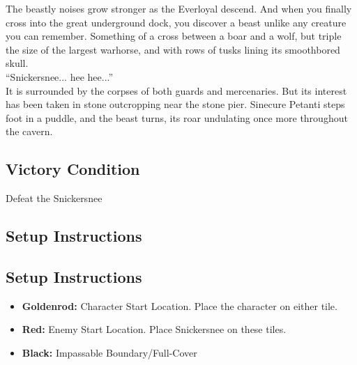 


The beastly noises grow stronger as the Everloyal descend. And when you finally cross into the great underground dock, you discover a beast unlike any creature you can remember. Something of a cross between a boar and a wolf, but triple the size of the largest warhorse, and with rows of tusks lining its smoothbored skull.\\

“Snickersnee... hee hee...”\\

It is surrounded by the corpses of both guards and mercenaries. But its interest has been taken in stone outcropping near the stone pier. Sinecure Petanti steps foot in a puddle, and the beast turns, its roar undulating once more throughout the cavern.

\subsection*{Victory Condition}
Defeat the Snickersnee

\subsection*{Setup Instructions}
\begin{center}
\end{center}

\subsection*{Setup Instructions}
\begin{itemize}
\item \textbf{Goldenrod:} Character Start Location. Place the character on either tile.
\item \textbf{Red:} Enemy Start Location. Place Snickersnee on these tiles.
\item \textbf{Black:} Impassable Boundary/Full-Cover
\end{itemize}

